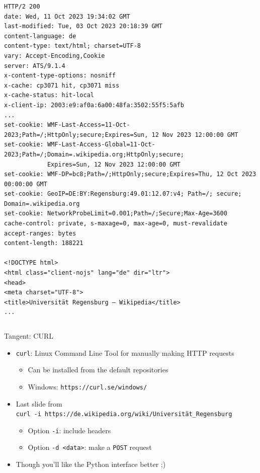\begin{frame}[fragile]
%
\vspace{-8pt}
\begin{cmdbox}
\begin{verbatim}
HTTP/2 200 
date: Wed, 11 Oct 2023 19:34:02 GMT
last-modified: Tue, 03 Oct 2023 20:18:39 GMT
content-language: de
content-type: text/html; charset=UTF-8
vary: Accept-Encoding,Cookie
server: ATS/9.1.4
x-content-type-options: nosniff
x-cache: cp3071 hit, cp3071 miss
x-cache-status: hit-local
x-client-ip: 2003:e9:af0a:6a00:48fa:3502:55f5:5afb
...
set-cookie: WMF-Last-Access=11-Oct-2023;Path=/;HttpOnly;secure;Expires=Sun, 12 Nov 2023 12:00:00 GMT
set-cookie: WMF-Last-Access-Global=11-Oct-2023;Path=/;Domain=.wikipedia.org;HttpOnly;secure;
            Expires=Sun, 12 Nov 2023 12:00:00 GMT
set-cookie: WMF-DP=bc8;Path=/;HttpOnly;secure;Expires=Thu, 12 Oct 2023 00:00:00 GMT
set-cookie: GeoIP=DE:BY:Regensburg:49.01:12.07:v4; Path=/; secure; Domain=.wikipedia.org
set-cookie: NetworkProbeLimit=0.001;Path=/;Secure;Max-Age=3600
cache-control: private, s-maxage=0, max-age=0, must-revalidate
accept-ranges: bytes
content-length: 188221

<!DOCTYPE html>
<html class="client-nojs" lang="de" dir="ltr">
<head>
<meta charset="UTF-8">
<title>Universität Regensburg – Wikipedia</title>
...
\end{verbatim}
\end{cmdbox}

\begin{verbatim}
\end{verbatim}
%
\end{frame}


\begin{frame}{Tangent: CURL}
%
\begin{itemize}
\item \texttt{curl}: Linux Command Line Tool for manually making HTTP requests
	\begin{itemize}
	\item Can be installed from the default repositories
	\item Windows: \texttt{https://curl.se/windows/}
	\end{itemize}
\item Last slide from\\
	\texttt{curl -i https://de.wikipedia.org/wiki/Universität\_Regensburg}
	\begin{itemize}
	\item Option \texttt{-i}: include headers
	\item Option \texttt{-d <data>}: make a \texttt{POST} request
	\end{itemize}
\item Though you'll like the Python interface better ;)
\end{itemize}
%
\end{frame}

